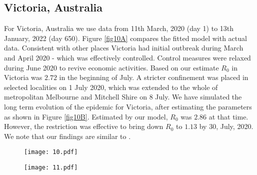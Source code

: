 \documentclass[10pt]{wlscirep}
\begin{document}
\subsection*{Victoria, Australia}
For Victoria, Australia we use data from 11th March, 2020 (day 1) to 13th January, 2022 (day 650). Figure \ref{fig10A} compares the fitted model with actual data. Consistent with other places Victoria had initial outbreak during March and April 2020 - which was effectively controlled.  Control measures were relaxed during June 2020 to revive economic activities.  Based on our estimate $R_0$ in Victoria was $2.72$ in the beginning of July.  A stricter confinement was placed in selected localities on 1 July 2020, which was extended to the whole of metropolitan Melbourne and Mitchell Shire on 8 July. We have simulated the long term evolution of the epidemic for Victoria, after estimating the parameters as shown in Figure \ref{fig10B}. Estimated by our model, $R_0$ was $2.86$ at that time. However, the restriction was effective to bring down $R_0$ to $1.13$ by 30, July, 2020. We note that our findings are similar to \cite{Saul2020}. 

\begin{figure*}[t!]
	\centering
	\begin{subfigure}[b]{\textwidth}
		\centering
		\texttt{[image: 10.pdf]}
	\end{subfigure}
	\caption{Model simulation compared to real data (Victoria, Australia) - Comparison between the official data (histogram) and the results with our model. Description of panels: \textbf{(a):} Number of currently active cases, $\left( Q(t) + H(t) + C(t)\right)$, \textbf{(b):} number of reported recovered individuals. $\int_{0}^{t}{\left( \mu Q(s) + \psi H(s) + \zeta  C(s) \right) ds}$, \textbf{(c):} number of reported infected with life-threatening symptoms, admitted to ICU, $C(t)$, \textbf{(d):} Number of deceased individuals $D(t)$, \textbf{(e):} Cumulative number of cases, $Q(t) + H(t) + C(t) + D(t) + \int_{0}^{t}{\left( \mu Q(s) + \psi H(s) + \zeta  C(s) \right) ds}$ \textbf{(f):} number of reported infected with symptoms, who are hospitalized. $H(t)$}
	\label{fig10A} 
\end{figure*}
%
%
\begin{figure*}[t!]
	\centering
	\begin{subfigure}[b]{\textwidth}
		\centering
		\texttt{[image: 11.pdf]}
	\end{subfigure}
	\caption{Model simulation compared to real data (Victoria, Australia) - Epidemic evolution predicted by the model based on the available data. Description of panels: \textbf{(a, c):} The short-term epidemic evolution obtained by reproducing the data trend with the model, \textbf{(b, d):} Long term epidemic evolution over 350 days. Plots refers to all cases of infection, both diagnosed and non-diagnosed, predicted by the model, although non-diagnosed cases are of course not counted in the data. Note that not all panels are in the same scale.}
	\label{fig10B} 
\end{figure*}
%
%
\end{document}
